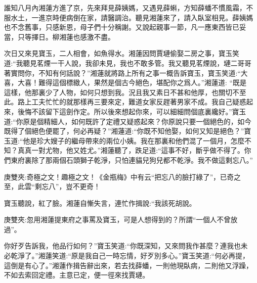 \begin{parag}
    誰知八月內湘蓮方進了京，先來拜見薛姨媽，又遇見薛蝌，方知薛蟠不慣風霜，不服水土，一進京時便病倒在家，請醫調治。聽見湘蓮來了，請入臥室相見。薛姨媽也不念舊事，只感新恩，母子們十分稱謝。又說起親事一節，凡一應東西皆已妥當，只等擇日。柳湘蓮也感激不盡。
\end{parag}


\begin{parag}
    次日又來見寶玉，二人相會，如魚得水。湘蓮因問賈璉偷娶二房之事，寶玉笑道:“我聽見茗煙一干人說，我卻未見，我也不敢多管。我又聽見茗煙說，璉二哥哥著實問你，不知有何話說？”湘蓮就將路上所有之事一概告訴寶玉，寶玉笑道:“大喜，大喜！難得這個標緻人，果然是個古今絕色，堪配你之爲人。”湘蓮道: “既是這樣，他那裏少了人物，如何只想到我。況且我又素日不甚和他厚，也關切不至此。路上工夫忙忙的就那樣再三要來定，難道女家反趕著男家不成。我自己疑惑起來，後悔不該留下這劍作定。所以後來想起你來，可以細細問個底裏纔好。”寶玉道:“你原是個精細人，如何既許了定禮又疑惑起來？你原說只要一個絕色的，如今既得了個絕色便罷了，何必再疑？”湘蓮道:“你既不知他娶，如何又知是絕色？”寶玉道:“他是珍大嫂子的繼母帶來的兩位小姨。我在那裏和他們混了一個月，怎麼不知？真真一對尤物，他又姓尤。”湘蓮聽了，跌足道:“這事不好，斷乎做不得了。你們東府裏除了那兩個石頭獅子乾淨，只怕連貓兒狗兒都不乾淨。我不做這剩忘八。”\begin{note}庚雙夾:奇極之文！趣極之文！《金瓶梅》中有云“把忘八的臉打綠了”，已奇之至，此雲“剩忘八”，豈不更奇！\end{note}寶玉聽說，紅了臉。湘蓮自慚失言，連忙作揖說:“我該死胡說。\begin{note}庚雙夾:忽用湘蓮提東府之事罵及寶玉，可是人想得到的？所謂“一個人不曾放過”。\end{note}你好歹告訴我，他品行如何？”寶玉笑道:“你既深知，又來問我作甚麼？連我也未必乾淨了。”湘蓮笑道:“原是我自己一時忘情，好歹別多心。”寶玉笑道:“何必再提，這倒是有心了。”湘蓮作揖告辭出來，若去找薛蟠，一則他現臥病，二則他又浮躁，不如去索回定禮。主意已定，便一徑來找賈璉。
\end{parag}


